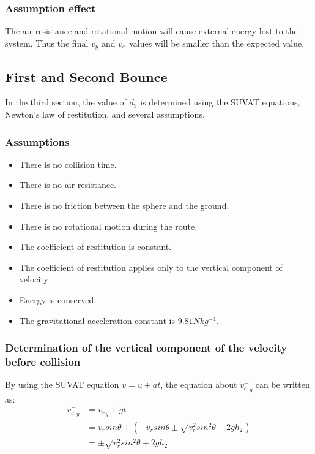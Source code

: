 \documentclass{article}
\begin{document}
        \subsubsection{Assumption effect}
        The air resistance and rotational motion will cause external energy lost to the system. Thus the final $v_y$ and $v_x$ values will be smaller than the expected value.
    \subsection{First and Second Bounce}
        In the third section, the value of $d_3$ is determined using the SUVAT equations, Newton's law of restitution, and several assumptions.
        \subsubsection{Assumptions}
            \begin{itemize}
                \item There is no collision time.
                \item There is no air resistance.
                \item There is no friction between the sphere and the ground.
                \item There is no rotational motion during the route.
                \item The coefficient of restitution is constant.
                \item The coefficient of restitution applies only to the vertical component of velocity
                \item Energy is conserved.
                \item The gravitational acceleration constant is $9.81Nkg^{-1}$.
            \end{itemize}
        \subsubsection{Determination of the vertical component of the velocity before collision}
            By using the SUVAT equation $v = u + at$, the equation about ${v^-_c}_y$ can be written as:
            \begin{equation}
                \begin{aligned}
                    {v^-_c}_y &= {v_r}_y + gt\\
                    &= v_rsin\theta + (-v_{r}sin\theta\pm\sqrt{{v^2_{r}sin^2\theta}+2gh_2}) \\
                    &= \pm\sqrt{{v^2_{r}sin^2\theta}+2gh_2}
                \end{aligned}
            \end{equation}
\end{document}
